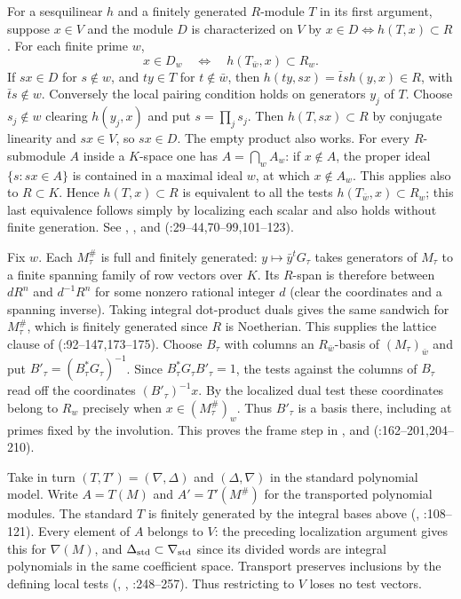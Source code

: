 For a sesquilinear $h$ and a finitely generated $R$-module $T$ in its
first argument, suppose $x\in V$ and the module $D$ is characterized
on $V$ by $x\in D\iff h(T,x)\subset R$. For each finite prime $w$,
\[
 x\in D_w\quad\Longleftrightarrow\quad h(T_{\bar w},x)\subset R_w .
\]
If $s x\in D$ for $s\notin w$, and $t y\in T$ for $t\notin\bar w$,
then $h(ty,sx)=\bar t s h(y,x)\in R$, with $\bar t s\notin w$.
Conversely the local pairing condition holds on generators $y_j$ of
$T$. Choose $s_j\notin w$ clearing $h(y_j,x)$ and put $s=\prod_j s_j$.
Then $h(T,sx)\subset R$ by conjugate linearity and $sx\in V$,
so $sx\in D$. The empty product also works. For every $R$-submodule
$A$ inside a $K$-space one has $A=\bigcap_w A_w$: if $x\notin A$,
the proper ideal $\{s:sx\in A\}$ is contained in a maximal ideal
$w$, at which $x\notin A_w$. This applies also to $R\subset K$.
Hence $h(T,x)\subset R$ is equivalent to all the tests
$h(T_{\bar w},x)\subset R_w$; this last equivalence follows simply
by localizing each scalar and also holds without finite generation.
See , ,
 and 
(:29--44,70--99,101--123).

Fix $w$. Each $M_\tau^\#$ is full and finitely generated:
$y\mapsto\bar y^t G_\tau$ takes generators of $M_\tau$ to a
finite spanning family of row vectors over $K$. Its $R$-span is
therefore between $dR^n$ and $d^{-1}R^n$ for some nonzero rational
integer $d$ (clear the coordinates and a spanning inverse).
Taking integral dot-product duals gives the same sandwich for
$M_\tau^\#$, which is finitely generated since $R$ is Noetherian.
This supplies the lattice clause of 
(:92--147,173--175).
Choose $B_\tau$ with columns an $R_{\bar w}$-basis of
$(M_\tau)_{\bar w}$ and put $B'_\tau=(B_\tau^*G_\tau)^{-1}$.
Since $B_\tau^*G_\tau B'_\tau=1$, the tests against the columns of
$B_\tau$ read off the coordinates $(B'_\tau)^{-1}x$. By the
localized dual test these coordinates belong to $R_w$ precisely when
$x\in (M_\tau^\#)_w$. Thus $B'_\tau$ is a basis there, including
at primes fixed by the involution. This proves the frame step in
,  and 
(:162--201,204--210).

Take in turn $(T,T')=(\nabla,\Delta)$ and $(\Delta,\nabla)$ in the
standard polynomial model. Write $A=T(M)$ and $A'=T'(M^\#)$ for
the transported polynomial modules. The standard $T$ is finitely
generated by the integral bases above
(, :108--121).
Every element of $A$ belongs to $V$: the preceding localization
argument gives this for $\nabla(M)$, and
$\Delta_{\rm std}\subset\nabla_{\rm std}$ since its divided
words are integral polynomials in the same coefficient space.
Transport preserves inclusions by the defining local tests
(, ,
:248--257).
Thus restricting to $V$ loses no test vectors.

